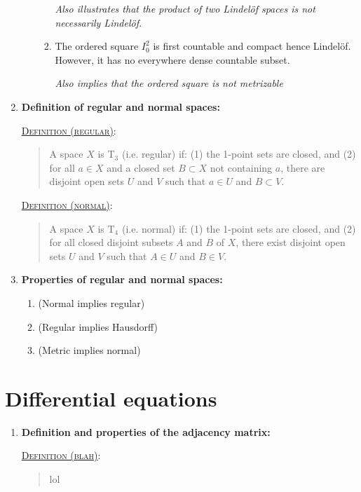 \documentclass[letterpaper, 12pt]{article}
\newcommand{\Taxiom}[1]{T$_\text{#1}$}
\newcommand{\defn}[2]{\textsc{\underline{Definition (#1)}:}\begin{quote} #2\end{quote}}
\begin{document}
\begin{enumerate}[resume]
\begin{enumerate}
\begin{enumerate}
            \textit{Also illustrates that the product of two Lindel\"of spaces is not necessarily Lindel\"of.}

            \item The ordered square $I_0^2$ is first countable and compact hence Lindel\"of. However, it has no everywhere dense countable subset.

            \textit{Also implies that the ordered square is not metrizable}
        \end{enumerate}
    \end{enumerate}
    \item \textbf{Definition of regular and normal spaces:}

    \defn{regular}{A space $X$ is \Taxiom{3} (i.e. regular) if: (1) the 1-point sets are closed, and (2) for all $a\in X$ and a closed set $B\subset X$ not containing $a$, there are disjoint open sets $U$ and $V$ such that $a\in U$ and $B\subset V$.}

    \defn{normal}{A space $X$ is \Taxiom{4} (i.e. normal) if: (1) the 1-point sets are closed, and (2) for all closed disjoint subsets $A$ and $B$ of $X$, there exist disjoint open sets $U$ and $V$ such that $A\in U$ and $B\in V$.}
    \item \textbf{Properties of regular and normal spaces:}
    \begin{enumerate}
        \item (Normal implies regular)
        \item (Regular implies Hausdorff)
        \item (Metric implies normal)
    \end{enumerate}
    \end{enumerate}

\section{Differential equations}
\begin{enumerate}[resume]
%
\item \textbf{Definition and properties of the adjacency matrix:}

\defn{blah}{lol}
%
\end{enumerate}
\end{document}
